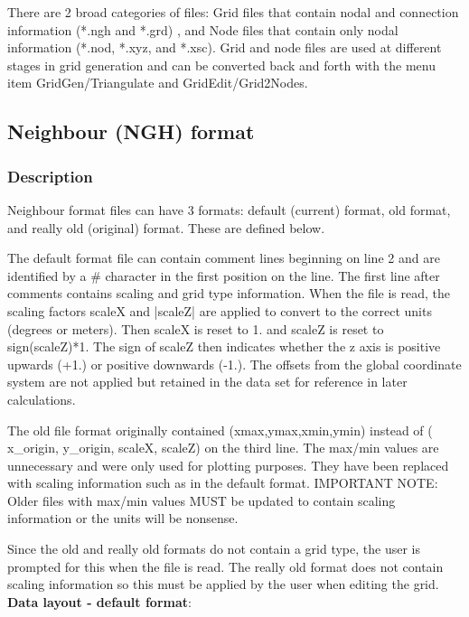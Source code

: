\documentclass{article}
\begin{document}
There are 2 broad categories of files: Grid files that contain nodal and connection information (*.ngh and *.grd)
, and Node files that contain only nodal information (*.nod, *.xyz, and *.xsc). Grid and node files are used at different 
stages in grid generation and can be converted back and forth with the menu item GridGen/Triangulate and
GridEdit/Grid2Nodes.

\newpage
\subsection[Neighbour (NGH) format]{Neighbour (NGH) format}

\subsubsection[Description]{Description}

Neighbour format files can have 3 formats: default (current) format, old format, and really old (original) format.
These are defined below.

The default format file can contain comment lines beginning on line 2 and are identified by a \# character in the
first position on the line. The first line after comments contains scaling and grid type information. When the file is read,
the scaling factors scaleX and |scaleZ| are applied to convert to the correct units (degrees or meters). Then scaleX
is reset to 1. and scaleZ is reset to sign(scaleZ)*1. The sign of scaleZ then indicates whether the z axis is positive
upwards (+1.) or positive downwards (-1.). The offsets from
the global coordinate system are not applied but retained in the data set for reference in later calculations.

The old file format originally contained (xmax,ymax,xmin,ymin) instead of ( x\_origin, y\_origin, scaleX, scaleZ) on the
third line. The max/min values are unnecessary and were only used for plotting purposes. They have been replaced
with scaling information such as in the default format. IMPORTANT NOTE: Older files with max/min values MUST
be updated to contain scaling information or the units will be nonsense.  

Since the old and really old formats do not contain a grid type, the user is prompted for this when the file is read.
The really old format does not contain scaling information so this must be applied by the user when editing the grid.\\

\textbf{Data layout - default format}: \\ 
\end{document}
